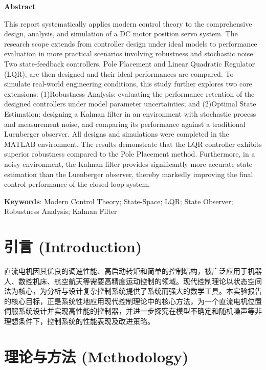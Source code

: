 \documentclass[12pt, a4paper]{article}
\begin{document}
\begin{center}
    \bfseries\large Abstract
\end{center}
\noindent
This report systematically applies modern control theory to the comprehensive design, analysis, and simulation of a DC motor position servo system. The research scope extends from controller design under ideal models to performance evaluation in more practical scenarios involving robustness and stochastic noise. Two state-feedback controllers, Pole Placement and Linear Quadratic Regulator (LQR), are then designed and their ideal performances are compared. To simulate real-world engineering conditions, this study further explores two core extensions: (1)Robustness Analysis: evaluating the performance retention of the designed controllers under model parameter uncertainties; and (2)Optimal State Estimation: designing a Kalman filter in an environment with stochastic process and measurement noise, and comparing its performance against a traditional Luenberger observer. All designs and simulations were completed in the MATLAB environment. The results demonstrate that the LQR controller exhibits superior robustness compared to the Pole Placement method. Furthermore, in a noisy environment, the Kalman filter provides significantly more accurate state estimation than the Luenberger observer, thereby markedly improving the final control performance of the closed-loop system.
\vspace{1em}

\noindent
\textbf{Keywords}: Modern Control Theory; State-Space; LQR; State Observer; Robustness Analysis; Kalman Filter


\tableofcontents 
\newpage

\section{引言 (Introduction)}
直流电机因其优良的调速性能、高启动转矩和简单的控制结构，被广泛应用于机器人、数控机床、航空航天等需要高精度运动控制的领域。现代控制理论以状态空间法为核心，为分析与设计复杂控制系统提供了系统而强大的数学工具。本实验报告的核心目标，正是系统性地应用现代控制理论中的核心方法，为一个直流电机位置伺服系统设计并实现高性能的控制器，并进一步探究在模型不确定和随机噪声等非理想条件下，控制系统的性能表现及改进策略。

\section{理论与方法 (Methodology)}
\end{document}
